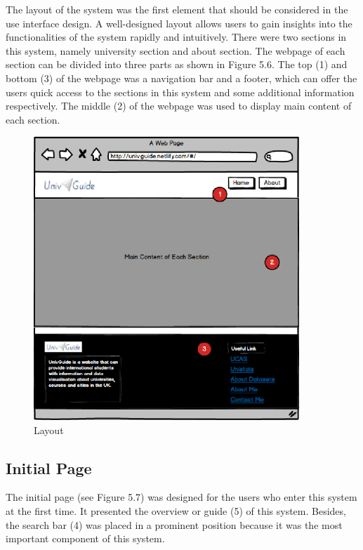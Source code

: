 The layout of the system was the first element that should be considered in the use interface design. A well-designed layout allows users to gain insights into the functionalities of the system rapidly and intuitively. There were two sections in this system, namely university section and about section. The webpage of each section can be divided into three parts as shown in Figure 5.6. The top (1) and bottom (3) of the webpage was a navigation bar and a footer, which can offer the users quick access to the sections in this system and some additional information respectively. The middle (2) of the webpage was used to display main content of each section.


\begin{figure}[H]
  \centering
  \includegraphics[width=10cm]{./img/Picture12}
  \caption{Layout}
  \label{Figure:figex}
\end{figure}



\subsection{Initial Page}
The initial page (see Figure 5.7) was designed for the users who enter this system at the first time.  It presented the overview or guide (5) of this system. Besides, the search bar (4) was placed in a prominent position because it was the most important component of this system.


